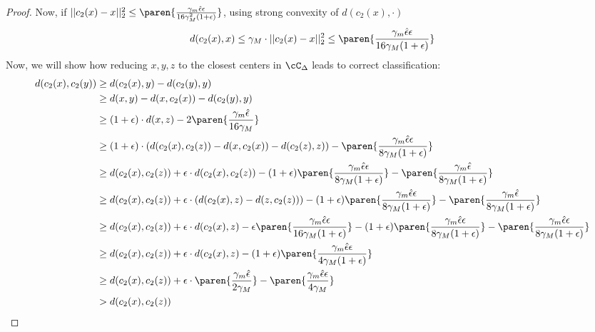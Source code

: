 \begin{proof}
    Now, if $||c_2(x) - x||^2_2 \le \paren{\frac{\gamma_m \hat{\epsilon}\epsilon}{16\gamma_M^2 (1 + \epsilon)}}$, using strong convexity of $d(c_2(x),\cdot)$
    \begin{align*}
        d(c_2(x), x) \le \gamma_M\cdot || c_2 (x) - x ||^2_2 \le \paren{\frac{\gamma_m \hat{\epsilon}\epsilon}{16\gamma_M (1 + \epsilon)}}
        \end{align*}
    Now, we will show how reducing $x,y,z$ to the closest centers in $\cC_{\Delta}$ leads to correct classification:
    \allowdisplaybreaks
    \begin{align}
        d(c_2(x), c_2(y)) &\ge d(c_2(x), y) - d(c_2(y), y)\\
                          & \ge d(x,y) - d(x, c_2(x)) - d(c_2(y), y)\\
                          & \ge (1+ \epsilon)\cdot d(x,z) - 2\paren{\frac{\gamma_m \hat{\epsilon}}{16\gamma_M}}\\
                          & \ge (1 + \epsilon)\cdot (d(c_2(x),c_2(z)) - d(x, c_2(x)) - d(c_2(z), z)) -  \paren{\frac{\gamma_m \hat{\epsilon}\epsilon}{8\gamma_M (1 + \epsilon)}}\\
                          & \ge d(c_2(x),c_2(z)) + \epsilon\cdot d(c_2(x),c_2(z)) - (1 + \epsilon) \paren{\frac{\gamma_m \hat{\epsilon}\epsilon}{8\gamma_M (1 + \epsilon)}} - \paren{\frac{\gamma_m \hat{\epsilon}}{8\gamma_M (1 + \epsilon)}}\\
                          & \ge d(c_2(x),c_2(z)) + \epsilon \cdot (d(c_2(x),z) - d(z, c_2(z))) - (1 + \epsilon) \paren{\frac{\gamma_m \hat{\epsilon}\epsilon}{8\gamma_M (1 + \epsilon)}} - \paren{\frac{\gamma_m \hat{\epsilon}}{8\gamma_M (1 + \epsilon)}}\\
                          & \ge d(c_2(x),c_2(z)) + \epsilon\cdot d(c_2(x),z) - \epsilon \paren{\frac{\gamma_m \hat{\epsilon}\epsilon}{16\gamma_M (1 + \epsilon)}}- (1 + \epsilon) \paren{\frac{\gamma_m \hat{\epsilon}\epsilon}{8\gamma_M (1 + \epsilon)}} - \paren{\frac{\gamma_m \hat{\epsilon}\epsilon}{8\gamma_M (1 + \epsilon)}}\\
                          & \ge d(c_2(x),c_2(z)) + \epsilon\cdot d(c_2(x),z) - (1 + \epsilon)\paren{\frac{\gamma_m \hat{\epsilon}\epsilon}{4\gamma_M (1 + \epsilon)}}\\
                          & \ge d(c_2(x),c_2(z)) + \epsilon \cdot \paren{\frac{\gamma_m \hat{\epsilon}}{2\gamma_M}} - \paren{\frac{\gamma_m \hat{\epsilon}\epsilon}{4\gamma_M}}\\
                          & > d(c_2(x),c_2(z))
    \end{align}
    

\end{proof}
